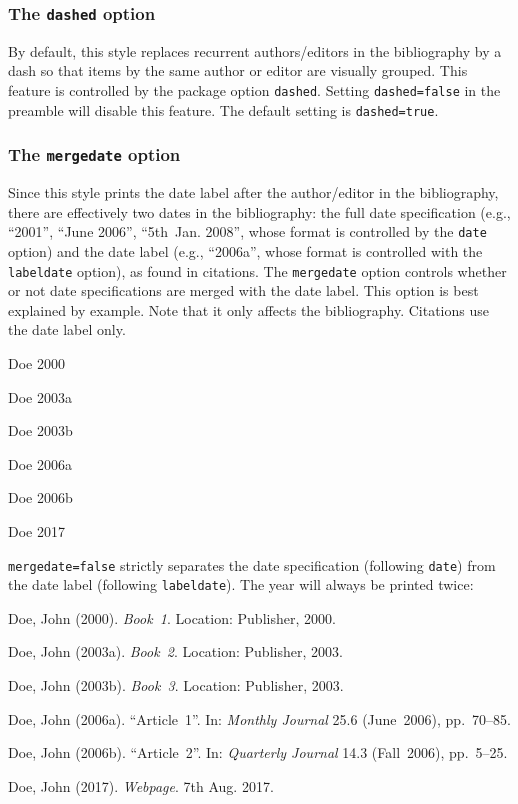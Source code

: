\documentclass[a4paper]{article}
\newenvironment{bibsample}
  {\trivlist\samepage
   \setlength{\itemsep}{0pt}}
  {\endtrivlist}
\begin{document}
\subsubsection*{The \texttt{dashed} option}

By default, this style replaces recurrent authors/editors in the
bibliography by a dash so that items by the same author or editor
are visually grouped. This feature is controlled by the package
option \texttt{dashed}. Setting \texttt{dashed=false} in the
preamble will disable this feature. The default setting is
\texttt{dashed=true}.

\subsubsection*{The \texttt{mergedate} option}

Since this style prints the date label after the author/editor in the
bibliography, there are effectively two dates in the bibliography:
the full date specification (e.g., \enquote{2001}, \enquote{June
2006}, \enquote{5th~Jan. 2008}, whose format is controlled by the
\texttt{date} option) and the date label (e.g., \enquote{2006a},
whose format is controlled with the \texttt{labeldate} option),
as found in citations. The \texttt{mergedate} option controls whether
or not date specifications are merged with the date label.
This option is best explained by example. Note that
it only affects the bibliography. Citations use the date label only.

\begin{bibsample}
\item Doe 2000
\item Doe 2003a
\item Doe 2003b
\item Doe 2006a
\item Doe 2006b
\item Doe 2017
\end{bibsample}

\texttt{mergedate=false} strictly separates the date specification
(following \texttt{date}) from the date label (following \texttt{labeldate}).
The year will always be printed twice:

\begin{bibsample}
\item Doe, John (2000). \emph{Book~1}. Location: Publisher, 2000.
\item Doe, John (2003a). \emph{Book~2}. Location: Publisher, 2003.
\item Doe, John (2003b). \emph{Book~3}. Location: Publisher, 2003.
\item Doe, John (2006a). \enquote{Article~1}. In: \emph{Monthly Journal} 25.6
(June~2006), pp.~70--85.
\item Doe, John (2006b). \enquote{Article~2}. In: \emph{Quarterly Journal} 14.3
(Fall~2006), pp.~5--25.
\item Doe, John (2017). \emph{Webpage}. 7th Aug. 2017.
\end{bibsample}
\end{document}
